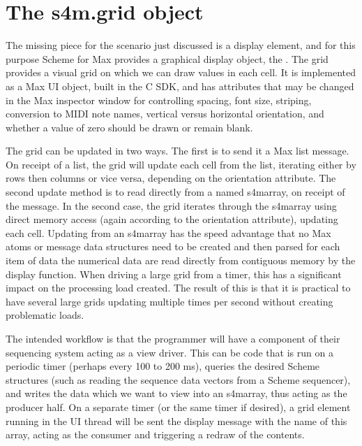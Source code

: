 \documentclass[letterpaper,10pt,english]{sphinxmanual}
\begin{document}
\section{The s4m.grid object}
\label{\detokenize{features_usage:the-s4m-grid-object}}
\sphinxAtStartPar
The missing piece for the scenario just discussed is a display element,
and for this purpose Scheme for Max provides a graphical display object, the .
The grid provides a visual grid on which we can draw values in each cell.
It is implemented as a Max UI object, built in the C SDK,
and has attributes that may be changed in the Max inspector window for
controlling spacing, font size, striping, conversion to MIDI note names,
vertical versus horizontal orientation,
and whether a value of zero should be drawn or remain blank.

\sphinxAtStartPar
The grid can be updated in two ways. The first is to send it a Max list message.
On receipt of a list, the grid will update each cell from the list, iterating
either by rows then columns or vice versa, depending on the orientation attribute.
The second update method is to read directly from a named s4m\sphinxhyphen{}array, on
receipt of the  message.
In the second case, the grid iterates through the s4m\sphinxhyphen{}array using direct memory access
(again according to the orientation attribute), updating each cell.
Updating from an s4m\sphinxhyphen{}array has the speed advantage that no Max atoms or
message data structures need to be created and then parsed for each item of data \sphinxhyphen{} the
numerical data are read directly from contiguous memory by the display
function.
When driving a large grid from a timer, this has a significant impact on the
processing load created. The result of this is that it is practical to have
several large grids updating multiple times per second without creating
problematic loads.

\sphinxAtStartPar
The intended workflow is that the programmer will have
a component of their sequencing system acting as a view driver.
This can be code that is run on a periodic timer (perhaps every 100 to 200 ms),
queries the desired Scheme structures (such as
reading the sequence data vectors from a Scheme sequencer),
and writes the data which we want to view into an s4m\sphinxhyphen{}array, thus acting
as the producer half.
On a separate timer (or the same timer if desired), a
grid element running in the UI thread will be sent the display message with the name of this
array, acting as the consumer and triggering a redraw of the contents.
\end{document}

